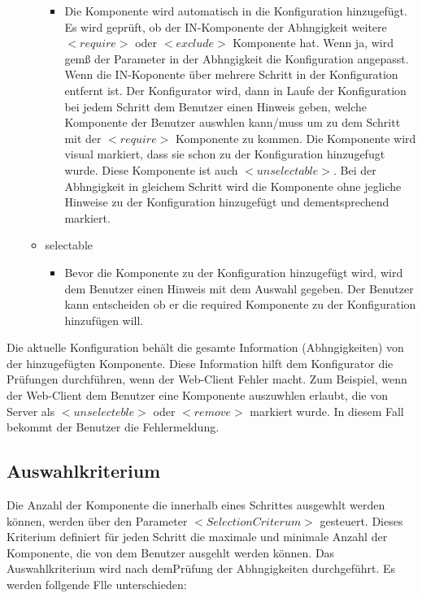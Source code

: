 \documentclass{article}
\begin{document}
\begin{itemize}
\begin{itemize}
\begin{itemize}
          \item Die Komponente wird automatisch in die Konfiguration hinzugef\"ugt.
          Es wird gepr\"uft, ob der IN-Komponente der Abhngigkeit weitere
          $<require>$ oder $<exclude>$ Komponente hat. Wenn ja, wird gem\ss{} der
          Parameter in der Abhngigkeit die Konfiguration angepasst. Wenn die
          IN-Koponente über mehrere Schritt in der Konfiguration entfernt ist. Der
          Konfigurator wird, dann in Laufe der Konfiguration bei jedem Schritt dem
          Benutzer einen Hinweis geben, welche Komponente der Benutzer auswhlen
          kann/muss um zu dem Schritt mit der $<require>$ Komponente zu kommen. Die
          Komponente wird visual markiert, dass sie schon zu der Konfiguration
          hinzugefugt wurde. Diese Komponente ist auch $<unselectable>$. Bei der
          Abhngigkeit in gleichem Schritt wird die Komponente ohne jegliche
          Hinweise zu der Konfiguration hinzugef\"ugt und dementsprechend markiert.
        \end{itemize}
    
        \item selectable
    
        \begin{itemize}
            \item Bevor die Komponente zu der Konfiguration hinzugef\"ugt wird, wird
            dem Benutzer einen Hinweis mit dem Auswahl gegeben. Der Benutzer kann
            entscheiden ob er die required Komponente zu der Konfiguration
            hinzuf\"ugen will.
        \end{itemize}
    \end{itemize}
\end{itemize}

Die aktuelle Konfiguration behält die gesamte Information (Abhngigkeiten)
von der hinzugef\"ugten Komponente. Diese Information hilft dem Konfigurator die
Pr\"ufungen durchf\"uhren, wenn der Web-Client Fehler macht. Zum Beispiel, wenn
der Web-Client dem Benutzer eine Komponente auszuwhlen erlaubt, die von
Server als $<unselecteble>$ oder $<remove>$ markiert wurde. In diesem Fall
bekommt der Benutzer die Fehlermeldung.

\subsection{Auswahlkriterium}

Die Anzahl der Komponente die innerhalb eines Schrittes ausgewhlt werden
können, werden über den Parameter $<SelectionCriterum>$ gesteuert. Dieses
Kriterium definiert für jeden Schritt die maximale und minimale Anzahl der
Komponente, die von dem Benutzer ausgehlt werden k\"onnen. Das Auswahlkriterium 
wird nach demPr\"ufung der Abhngigkeiten durchgeführt. Es werden follgende Flle
unterschieden:
\end{document}
